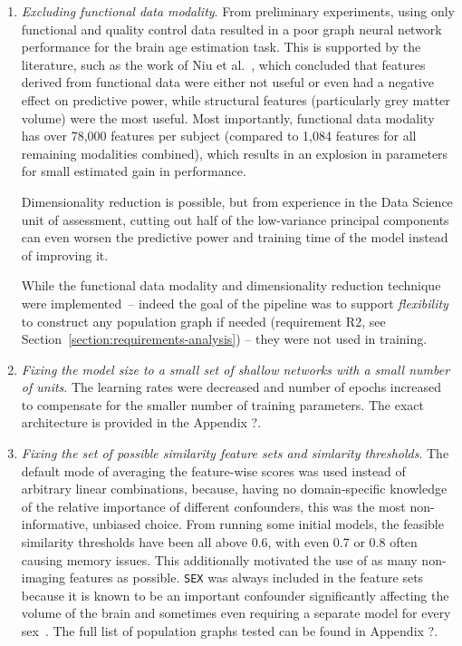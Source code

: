 \begin{enumerate}
    \item \textit{Excluding functional data modality}. From preliminary experiments, using only functional and quality control data resulted in a poor graph neural network performance for the brain age estimation task. This is supported by the literature, such as the work of Niu et al.~\cite{niu2019improved}, which concluded that features derived from functional data were either not useful or even had a negative effect on predictive power, while structural features (particularly grey matter volume) were the most useful. Most importantly, functional data modality has over 78,000 features per subject (compared to 1,084 features for all remaining modalities combined), which results in an explosion in parameters for small estimated gain in performance. 
    
    Dimensionality reduction is possible, but from experience in the Data Science unit of assessment, cutting out half of the low-variance principal components can even worsen the predictive power and training time of the model instead of improving it. 
    
    While the functional data modality and dimensionality reduction technique were implemented~– indeed the goal of the pipeline was to support \textit{flexibility} to construct any population graph if needed (requirement R2, see Section~\ref{section:requirements-analysis}) – they were not used in training.
    \item \textit{Fixing the model size to a small set of shallow networks with a small number of units}. The learning rates were decreased and number of epochs increased to compensate for the smaller number of training parameters. The exact architecture is provided in the Appendix ?.
    \item \textit{Fixing the set of possible similarity feature sets and simlarity thresholds}. The default mode of averaging the feature-wise scores was used instead of arbitrary linear combinations, because, having no domain-specific knowledge of the relative importance of different confounders, this was the most non-informative, unbiased choice. From running some initial models, the feasible similarity thresholds have been all above 0.6, with even 0.7 or 0.8 often causing memory issues. This additionally motivated the use of as many non-imaging features as possible. \texttt{SEX} was always included in the feature sets because it is known to be an important confounder significantly affecting the volume of the brain and sometimes even requiring a separate model for every sex~\cite{kaufmann2019}. The full list of population graphs tested can be found in Appendix ?.
\end{enumerate}

